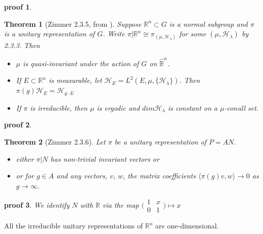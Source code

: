 \documentclass[
  12pt
]{article}
\theoremstyle{break}
\newtheorem{thm}{Theorem}
\theoremstyle{plain}
\newtheorem*{pf}{proof}
\newcommand{\mpi}{\ensuremath{\pi}\xspace}
\newcommand{\bbr}{\ensuremath{\mathbb{R}}\xspace}
\newcommand{\ipmatrix}[1]{%
\ensuremath{\big(\begin{smallmatrix} #1 \end{smallmatrix}\big)}\xspace}
\begin{document}
  \begin{pf}
    \label{pf:2.3.4}
  \end{pf}

  \begin{thm}[Zimmer 2.3.5, from  \cite{mackey76}]
    \label{thm:2.3.5}
    Suppose $\mathbb{R}^n \subset G$ is a normal subgroup and $\pi$ is a unitary representation of $G$.
    Write $\pi | \mathbb{R}^n \cong \pi_{(\mu, \mathscr{H}_{\lambda})}$ for some
    $(\mu, \mathscr{H}_{\lambda})$ by 2.3.3. Then  
    \begin{itemize}
      \item $\mu$ is quasi-invariant under the action of $G$ on $\hat{\mathbb{R}}^n$. 
      \item If $E \subset \mathbb{R}^n$ is measurable, let
        $\mathscr{H}_E = L^2(E, \mu, \{\mathscr{H}_{\lambda}\})$.
        Then $\pi(g)\mathscr{H}_E = \mathscr{H}_{g \cdot E}$
      \item If $\pi$ is irreducible, then $\mu$ is ergodic and $dim\mathscr{H}_{\lambda}$ is
        constant on a $\mu$-conull set.
    \end{itemize}
  \end{thm}

  \begin{pf}
  \end{pf}

  \begin{thm}[Zimmer 2.3.6]
    \label{thm:2.3.6}
    Let \mpi be  a unitary representation of $P = AN$.
    \begin{itemize}
      \item either $\pi|N$ has non-trivial invariant vectors or
      \item or for $g \in A$ and any vectors, $v$, $w$, the matrix coefficients
        $\langle \pi(g)v, w \rangle \rightarrow 0$ as $g \rightarrow \infty$.
    \end{itemize}
  \end{thm}

  \begin{pf}
    We identify $N$ with \bbr via the map $\ipmatrix{1 & x \\ 0 & 1} \mapsto x$ 
  \end{pf}


  All the irreducible unitary
  representations of $\mathbb{R}^n$ are one-dimensional.
\end{document}

